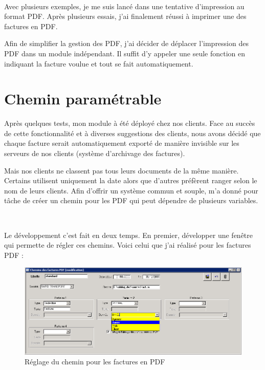 ~

Avec plusieurs exemples, je me suis lancé dans une tentative d'impression au format PDF. Après plusieurs essais, j'ai finalement réussi à imprimer une des factures en PDF.

Afin de simplifier la gestion des PDF, j'ai décider de déplacer l'impression des PDF dans un module indépendant. Il suffit d'y appeler une seule fonction en indiquant la facture voulue et tout se fait automatiquement.

\section{Chemin paramétrable}
Après quelques tests, mon module à été déployé chez nos clients. Face au succès de cette fonctionnalité et à diverses suggestions des clients, nous avons décidé que chaque facture serait automatiquement exporté de manière invisible sur les serveurs de nos clients (système d'archivage des factures).

Mais nos clients ne classent pas tous leurs documents de la même manière. Certains utilisent uniquement la date alors que d'autres préfèrent ranger selon le nom de leurs clients. Afin d'offrir un système commun et souple, \solulog{} m'a donné pour tâche de créer un chemin pour les PDF qui peut dépendre de plusieurs variables.

~

Le développement c'est fait en deux temps. En premier, développer une fenêtre qui permette de régler ces chemins. Voici celui que j'ai réalisé pour les factures PDF :
\begin{figure}[h!]
	\begin{center}
		\includegraphics[scale=.78]{Contenu/Synthese_SeptembreAvril/Images/Chemin_PDF.png}
	\end{center}

	\caption{Réglage du chemin pour les factures en PDF}
	\label{segment_NAD_CA}
\end{figure}

